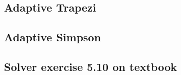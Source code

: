 \subsection{Adaptive Trapezi}
\label{subsec:adaptiveTrapezi}


\subsection{Adaptive Simpson}
\label{subsec:adaptiveSimpson}


\subsection{Solver exercise 5.10 on textbook}
\label{subsec:exercise510solver}
